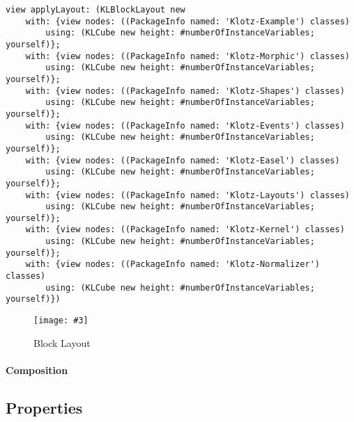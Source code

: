 \documentclass{sig-alternate}
\newcommand{\fig}[4]{
	\begin{figure}[#1]
		\centering
		\texttt{[image: \#3]}
		\caption{\label{fig:#3}#4}
	\end{figure}}
\newcommand{\seclabel}[1]{\label{sec:#1}}
\begin{document}
\begin{lstlisting}
view applyLayout: (KLBlockLayout new
	with: {view nodes: ((PackageInfo named: 'Klotz-Example') classes) 
		using: (KLCube new height: #numberOfInstanceVariables; yourself)};
	with: {view nodes: ((PackageInfo named: 'Klotz-Morphic') classes)
		using: (KLCube new height: #numberOfInstanceVariables; yourself)};
	with: {view nodes: ((PackageInfo named: 'Klotz-Shapes') classes)
		using: (KLCube new height: #numberOfInstanceVariables; yourself)};
	with: {view nodes: ((PackageInfo named: 'Klotz-Events') classes)
		using: (KLCube new height: #numberOfInstanceVariables; yourself)};		
	with: {view nodes: ((PackageInfo named: 'Klotz-Easel') classes)
		using: (KLCube new height: #numberOfInstanceVariables; yourself)};
	with: {view nodes: ((PackageInfo named: 'Klotz-Layouts') classes)
		using: (KLCube new height: #numberOfInstanceVariables; yourself)};
	with: {view nodes: ((PackageInfo named: 'Klotz-Kernel') classes)
		using: (KLCube new height: #numberOfInstanceVariables; yourself)};
	with: {view nodes: ((PackageInfo named: 'Klotz-Normalizer') classes)
		using: (KLCube new height: #numberOfInstanceVariables; yourself)})
\end{lstlisting}
\fig{}{0.4}{figure9.png}{Block Layout}

\paragraph{Composition}

\subsection{Properties} \seclabel{properties}
\end{document}

